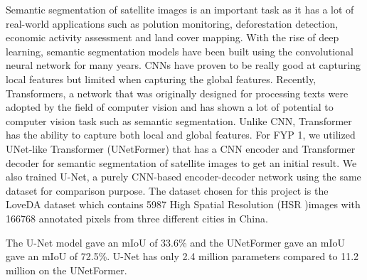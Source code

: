 
Semantic segmentation of satellite images is an important task as it has a lot of real-world applications such as polution monitoring, deforestation detection, economic activity assessment and land cover mapping. With the rise of deep learning, semantic segmentation models have been built using the convolutional neural network for many years. CNNs have proven to be really good at capturing local features but limited when capturing the global features. Recently, Transformers, a network that was originally designed for processing texts were adopted by the field of computer vision and has shown a lot of potential to computer vision task such as semantic segmentation. Unlike CNN, Transformer has the ability to capture both local and global features. For FYP 1, we utilized UNet-like Transformer (UNetFormer) that has a CNN encoder and Transformer decoder for semantic segmentation of satellite images to get an initial result. We also trained  U-Net, a purely CNN-based encoder-decoder network using the same dataset for comparison purpose. The dataset chosen for this project is the LoveDA dataset which contains 5987 High Spatial Resolution (HSR )images with 166768 annotated pixels from three different cities in China.

The U-Net model gave an mIoU of 33.6\% and the UNetFormer gave an mIoU gave an mIoU of 72.5\%. U-Net has only 2.4 million parameters compared to 11.2 million on the UNetFormer.

